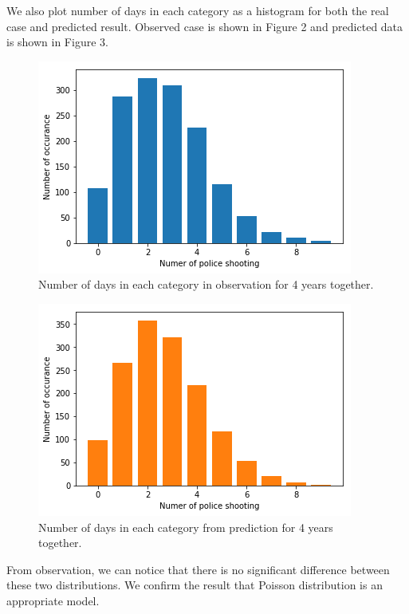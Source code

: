 \documentclass[11pt,a4paper,english]{article}
\begin{document}
We also plot number of days in each category as a histogram for both the real case and predicted result. Observed case is shown in Figure 2 and predicted data is shown in Figure 3.
\begin{figure}[htbp]
	\centering
	\includegraphics[width = \textwidth]{4-years.png}
	\caption{Number of days in each category in observation for 4 years together.}
\end{figure}
\begin{figure}[htbp]
	\centering
	\includegraphics[width = \textwidth]{poisson.png}
	\caption{Number of days in each category from prediction for 4 years together.}
\end{figure}

From observation, we can notice that there is no significant difference between these two distributions. We confirm the result that Poisson distribution is an appropriate model.
\end{document}
